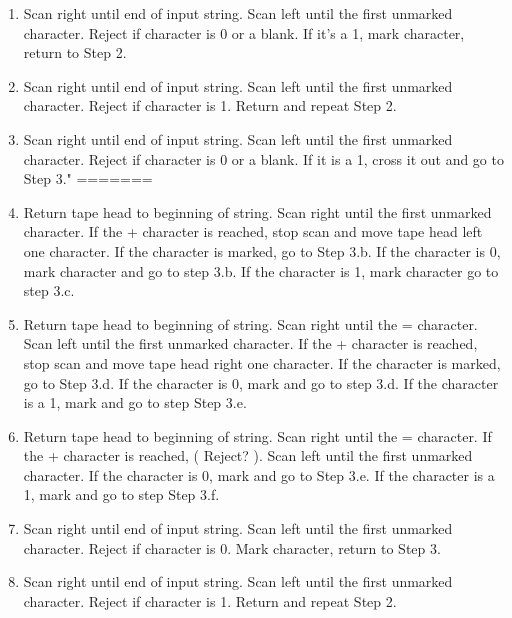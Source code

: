 ﻿\documentclass{article}
\begin{document}
\begin{enumerate}[a)]
\begin{enumerate}[1)]
\begin{enumerate}[(3.a)]
    \item Scan right until end of input string. Scan left until the first unmarked character. Reject if character is 0 or a blank. If it's a 1, mark character, return to Step 2.
    
    \item Scan right until end of input string. Scan left until the first unmarked character. Reject if character is 1. Return and repeat Step 2.
    
    \item Scan right until end of input string. Scan left until the first unmarked character. Reject if character is 0 or a blank. If it is a 1, cross it out and go to Step 3."
=======
    \item Return tape head to beginning of string. Scan right until the first unmarked character. If the + character is reached, stop scan and move tape head left one character. If the character is marked, go to Step 3.b. If the character is 0, mark character and go to step 3.b. If the character is 1, mark character go to step 3.c.
    
    \item Return tape head to beginning of string. Scan right until the = character. Scan left until the first unmarked character. If the + character is reached, stop scan and move tape head right one character. If the character is marked, go to Step 3.d. If the character is 0, mark and go to step 3.d.  If the character is a 1, mark and go to step Step 3.e.
    
    \item Return tape head to beginning of string. Scan right until the = character. If the + character is reached, ( Reject? ).  Scan left until the first unmarked character. If the character is 0, mark and go to Step 3.e.  If the character is a 1, mark and go to step Step 3.f.
    
    \item Scan right until end of input string. Scan left until the first unmarked character. Reject if character is 0.  Mark character, return to Step 3.
    
    \item Scan right until end of input string. Scan left until the first unmarked character. Reject if character is 1. Return and repeat Step 2.
    

\end{enumerate}
\end{enumerate}
\end{enumerate}
\end{document}

